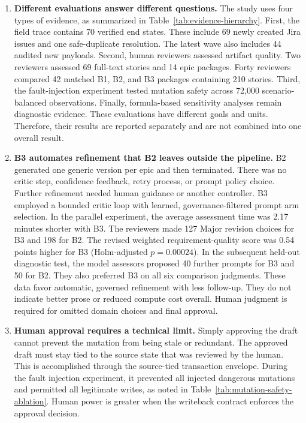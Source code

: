 \documentclass[manuscript,review]{acmart}
\begin{document}
\begin{enumerate}
  \item \textbf{Different evaluations answer different questions.} The study uses four types of evidence, as summarized in Table~\ref{tab:evidence-hierarchy}. First, the field trace contains 70 verified end states. These include 69 newly created Jira issues and one safe-duplicate resolution. The latest wave also includes 44 audited new payloads. Second, human reviewers assessed artifact quality. Two reviewers assessed 69 full-text stories and 14 epic packages. Forty reviewers compared 42 matched B1, B2, and B3 packages containing 210 stories. Third, the fault-injection experiment tested mutation safety across 72,000 scenario-balanced observations. Finally, formula-based sensitivity analyses remain diagnostic evidence. These evaluations have different goals and units. Therefore, their results are reported separately and are not combined into one overall result.

  \item \textbf{B3 automates refinement that B2 leaves outside the pipeline.} B2 generated one generic version per epic and then terminated. There was no critic step, confidence feedback, retry process, or prompt policy choice. Further refinement needed human guidance or another controller. B3 employed a bounded critic loop with learned, governance-filtered prompt arm selection. In the parallel experiment, the average assessment time was 2.17 minutes shorter with B3. The reviewers made 127 Major revision choices for B3 and 198 for B2. The revised weighted requirement-quality score was 0.54 points higher for B3 (Holm-adjusted $p=0.00024$). In the subsequent held-out diagnostic test, the model assessors proposed 40 further prompts for B3 and 50 for B2. They also preferred B3 on all six comparison judgments. These data favor automatic, governed refinement with less follow-up. They do not indicate better prose or reduced compute cost overall. Human judgment is required for omitted domain choices and final approval.

  \item \textbf{Human approval requires a technical limit.} Simply approving the draft cannot prevent the mutation from being stale or redundant. The approved draft must stay tied to the source state that was reviewed by the human. This is accomplished through the source-tied transaction envelope. During the fault injection experiment, it prevented all injected dangerous mutations and permitted all legitimate writes, as noted in Table~\ref{tab:mutation-safety-ablation}. Human power is greater when the writeback contract enforces the approval decision.


\end{enumerate}
\end{document}
